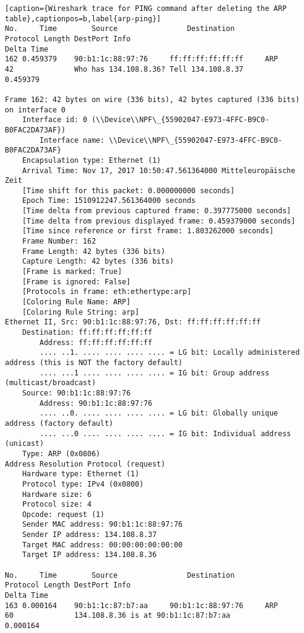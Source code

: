 \begin{lstlisting}[caption={Wireshark trace for PING command after deleting the ARP table},captionpos=b,label{arp-ping}]
No.     Time        Source                Destination           Protocol Length DestPort Info                                                            Delta Time
162 0.459379    90:b1:1c:88:97:76     ff:ff:ff:ff:ff:ff     ARP      42              Who has 134.108.8.36? Tell 134.108.8.37                         0.459379

Frame 162: 42 bytes on wire (336 bits), 42 bytes captured (336 bits) on interface 0
	Interface id: 0 (\\Device\\NPF\_{55902047-E973-4FFC-B9C0-B0FAC2DA73AF})
		Interface name: \\Device\\NPF\_{55902047-E973-4FFC-B9C0-B0FAC2DA73AF}
	Encapsulation type: Ethernet (1)
	Arrival Time: Nov 17, 2017 10:50:47.561364000 Mitteleuropäische Zeit
	[Time shift for this packet: 0.000000000 seconds]
	Epoch Time: 1510912247.561364000 seconds
	[Time delta from previous captured frame: 0.397775000 seconds]
	[Time delta from previous displayed frame: 0.459379000 seconds]
	[Time since reference or first frame: 1.803262000 seconds]
	Frame Number: 162
	Frame Length: 42 bytes (336 bits)
	Capture Length: 42 bytes (336 bits)
	[Frame is marked: True]
	[Frame is ignored: False]
	[Protocols in frame: eth:ethertype:arp]
	[Coloring Rule Name: ARP]
	[Coloring Rule String: arp]
Ethernet II, Src: 90:b1:1c:88:97:76, Dst: ff:ff:ff:ff:ff:ff
	Destination: ff:ff:ff:ff:ff:ff
		Address: ff:ff:ff:ff:ff:ff
		.... ..1. .... .... .... .... = LG bit: Locally administered address (this is NOT the factory default)
		.... ...1 .... .... .... .... = IG bit: Group address (multicast/broadcast)
	Source: 90:b1:1c:88:97:76
		Address: 90:b1:1c:88:97:76
		.... ..0. .... .... .... .... = LG bit: Globally unique address (factory default)
		.... ...0 .... .... .... .... = IG bit: Individual address (unicast)
	Type: ARP (0x0806)
Address Resolution Protocol (request)
	Hardware type: Ethernet (1)
	Protocol type: IPv4 (0x0800)
	Hardware size: 6
	Protocol size: 4
	Opcode: request (1)
	Sender MAC address: 90:b1:1c:88:97:76
	Sender IP address: 134.108.8.37
	Target MAC address: 00:00:00:00:00:00
	Target IP address: 134.108.8.36

No.     Time        Source                Destination           Protocol Length DestPort Info                                                            Delta Time
163 0.000164    90:b1:1c:87:b7:aa     90:b1:1c:88:97:76     ARP      60              134.108.8.36 is at 90:b1:1c:87:b7:aa                            0.000164


\end{lstlisting}
